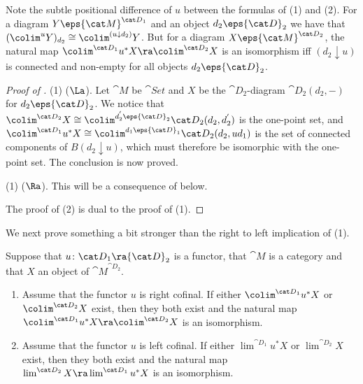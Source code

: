 Note the subtle positional difference of $u$ between the formulas of  (1) and  (2). For a diagram $Y \eps {\cat M}^{{\cat D}_1}$ and an object $d_2 \eps {\cat D}_2$ we have that $(\colim^u Y)_{d_2} \cong \colim^{(u \downarrow d_2)}Y$. But for a diagram $X \eps {\cat M}^{{\cat D}_2}$, the natural map $\colim^{{\cat D}_1}u^*X \ra \colim^{{\cat D}_2}X$ is an isomorphism iff $(d_2 \downarrow u)$ is connected and non-empty for all objects $d_2 \eps {\cat D}_2$.

\begin{proof}[Proof of ]
\mbox{}

(1) ($\La$). Let ${\cat M}$ be ${\cat Set}$ and $X$ be the ${\cat D}_2$-diagram ${{\cat D}_2}(d_2, -)$ for $d_2 \eps {\cat D}_2$. We notice that $\colim^{{\cat D}_2}X \cong \colim^{d^{'}_2 \eps {\cat D}_2} {{\cat D}_2}(d_2, d^{'}_2)$ is the one-point set, and $\colim^{{\cat D}_1}u^*X \cong \colim^{d_1 \eps {\cat D}_1} {{\cat D}_2}(d_2, ud_1)$ is the set of connected components of $B(d_2 \downarrow u)$, which must therefore be isomorphic with the one-point set. The conclusion is now proved.

(1) ($\Ra$). This will be a consequence of  below. 

The proof of (2) is dual to the proof of (1).
\end{proof}

We next prove something a bit stronger than the right to left implication of  (1).

\begin{prop}
\label{prop:cofinallimit}
Suppose that $u \colon {\cat D}_1 \ra {\cat D}_2$ is a functor, that ${\cat M}$ is a category and that $X$ an object of ${\cat M}^{{\cat D}_2}$.
\begin{enumerate}
\item
Assume that the functor $u$ is right cofinal. If either $\colim^{{\cat D}_1}u^*X$ or $\colim^{{\cat D}_2}X$ exist, then they both exist and the natural map $\colim^{{\cat D}_1}u^*X \ra \colim^{{\cat D}_2}X$ is an isomorphism.
\item
Assume that the functor $u$ is left cofinal. If either $\lim^{{\cat D}_1}u^*X$ or $\lim^{{\cat D}_2}X$ exist, then they both exist and the natural map $\lim^{{\cat D}_2}X \ra \lim^{{\cat D}_1}u^*X$ is an isomorphism.
\end{enumerate}
\end{prop}


